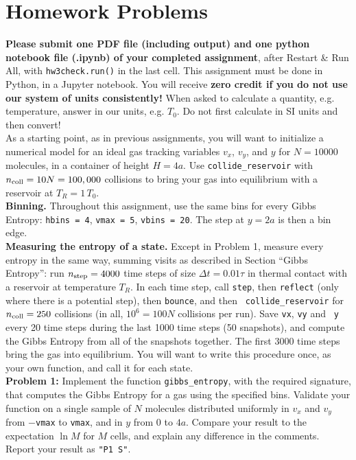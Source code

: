 \documentclass[12pt]{article}
\begin{document}
\section{Homework Problems}

\noindent
{\bf Please submit one PDF file (including output) and one python
  notebook file (.ipynb) of your completed assignment}, after Restart
\& Run All, with {\tt hw3check.run()} in the last cell.  This
assignment must be done in Python, in a Jupyter notebook.
You will receive {\bf zero credit if you do not use our system of
  units consistently!}  When asked to calculate a quantity,
e.g. temperature, answer in our units, e.g. $T_0$.  Do not first
calculate in SI units and then convert!\\[8pt]

\noindent
As a starting point, as in previous assignments, you will want to
initialize a numerical model for an ideal gas tracking variables
$v_x$, $v_y$, and $y$ for $N=10000$ molecules, in a container of
height $H=4a$.  Use {\tt collide\_reservoir} with $n_{\rm coll} = 10 N
= 100,000$ collisions to bring your gas into equilibrium with a
reservoir at $T_R = 1\, T_0$.\\[3pt]

\noindent
{\bf Binning.}  Throughout this assignment, use the same bins for every
Gibbs Entropy: {\tt hbins = 4}, {\tt vmax = 5}, {\tt vbins = 20}.  The
step at $y = 2a$ is then a bin edge.\\[3pt]

\noindent
{\bf Measuring the entropy of a state.}  Except in Problem 1, measure
every entropy in the same way, summing visits as described in Section
``Gibbs Entropy'': run $n_{\rm step} = 4000$ time steps of size $\Delta
t = 0.01\tau$ in thermal contact with a reservoir at temperature $T_R$.
In each time step, call {\tt step}, then {\tt reflect} (only where
there is a potential step), then {\tt bounce}, and then {\tt
  collide\_reservoir} for $n_{\rm coll} = 250$ collisions (in all,
$10^6 = 100 N$ collisions per run).  Save {\tt vx}, {\tt vy} and {\tt
  y} every 20 time steps during the last 1000 time steps (50
snapshots), and compute the Gibbs Entropy from all of the snapshots
together.  The first 3000 time steps bring the gas into equilibrium.
You will want to write this procedure once, as your own function, and
call it for each state.\\[3pt]

\noindent
{\bf Problem 1:} Implement the function {\tt gibbs\_entropy}, with the
required signature, that computes the Gibbs Entropy for a gas using
the specified bins.  Validate your function on a single sample of $N$
molecules distributed uniformly in $v_x$ and $v_y$ from $-${\tt vmax}
to {\tt vmax}, and in $y$ from $0$ to $4a$.  Compare your result to
the expectation $\ln M$ for $M$ cells, and explain any difference in
the comments.  Report your result as {\tt "P1 S"}.\\[3pt]
\end{document}

